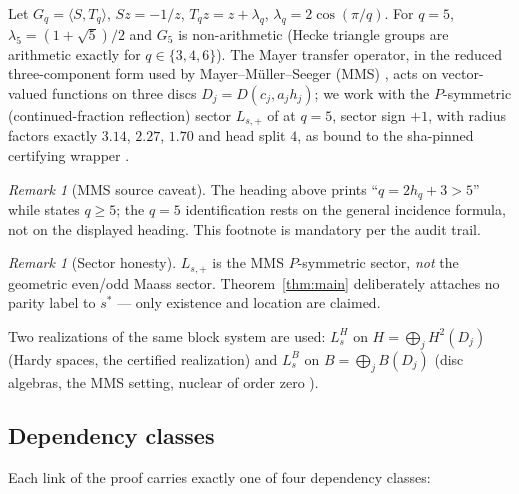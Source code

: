 \documentclass[11pt]{article}
\theoremstyle{definition}
\theoremstyle{remark}
\newtheorem{remark}[theorem]{Remark}
\begin{document}
Let $G_q = \langle S, T_q \rangle$, $S z = -1/z$,
$T_q z = z + \lambda_q$, $\lambda_q = 2\cos(\pi/q)$. For $q = 5$,
$\lambda_5 = (1+\sqrt5)/2$ and $G_5$ is non-arithmetic (Hecke triangle
groups are arithmetic exactly for $q \in \{3,4,6\}$). The Mayer
transfer operator, in the reduced three-component form used by
Mayer--M\"uller--Seeger (MMS) \cite{MMS}, acts on vector-valued
functions on three discs $D_j = D(c_j, a_j h_j)$; we work with the
$P$-symmetric (continued-fraction reflection) sector $L_{s,+}$ of
\cite[eq.~(34)]{MMS} at $q = 5$, sector sign $+1$, with radius factors
exactly $3.14$, $2.27$, $1.70$ and head split $4$, as bound to the
sha-pinned certifying wrapper \cite{R3bReceipt}.

\begin{remark}[MMS source caveat]
\label{rem:mmsq}
The heading above \cite[eq.~(34)]{MMS} prints ``$q = 2h_q + 3 > 5$''
while \cite[Lemma~4.2]{MMS} states $q \ge 5$; the $q = 5$
identification rests on the general incidence formula, not on the
displayed heading. This footnote is mandatory per the audit trail.
\end{remark}

\begin{remark}[Sector honesty]
$L_{s,+}$ is the MMS $P$-symmetric sector, \emph{not} the geometric
even/odd Maass sector. Theorem~\ref{thm:main} deliberately attaches no
parity label to $s^*$ --- only existence and location are claimed.
\end{remark}

Two realizations of the same block system are used:
$L_s^{H}$ on $H = \bigoplus_j H^2(D_j)$ (Hardy spaces, the certified
realization) and $L_s^{B}$ on $B = \bigoplus_j B(D_j)$ (disc algebras,
the MMS setting, nuclear of order zero \cite[Thm~4.10]{MMS}).

\subsection{Dependency classes}

Each link of the proof carries exactly one of four dependency classes:
\end{document}
